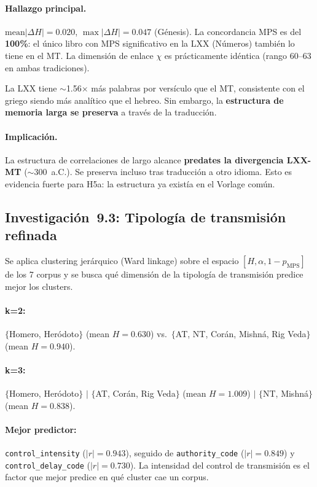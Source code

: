 \documentclass[12pt,a4paper]{article}
\begin{document}
\paragraph{Hallazgo principal.}
$\text{mean}|\Delta H| = 0.020$, $\max|\Delta H| = 0.047$ (G\'enesis).
La concordancia MPS es del \textbf{100\%}: el \'unico libro con MPS significativo
en la LXX (N\'umeros) tambi\'en lo tiene en el MT. La dimensi\'on de enlace $\chi$
es pr\'acticamente id\'entica (rango 60--63 en ambas tradiciones).

La LXX tiene $\sim$1.56$\times$ m\'as palabras por vers\'iculo que el MT, consistente
con el griego siendo m\'as anal\'itico que el hebreo. Sin embargo, la
\textbf{estructura de memoria larga se preserva} a trav\'es de la traducci\'on.

\paragraph{Implicaci\'on.}
La estructura de correlaciones de largo alcance \textbf{predates la divergencia
LXX-MT} ($\sim$300~a.C.). Se preserva incluso tras traducci\'on a otro idioma.
Esto es evidencia fuerte para H5a: la estructura ya exist\'ia en el Vorlage com\'un.


\subsection{Investigaci\'on~9.3: Tipolog\'ia de transmisi\'on refinada}

Se aplica clustering jer\'arquico (Ward linkage) sobre el espacio
$[H, \alpha, 1 - p_{\text{MPS}}]$ de los 7 corpus y se busca qu\'e
dimensi\'on de la tipolog\'ia de transmisi\'on predice mejor los clusters.

\paragraph{k=2:} $\{$Homero, Her\'odoto$\}$ (mean $H = 0.630$) vs.\
$\{$AT, NT, Cor\'an, Mishn\'a, Rig Veda$\}$ (mean $H = 0.940$).

\paragraph{k=3:} $\{$Homero, Her\'odoto$\}$ $|$ $\{$AT, Cor\'an, Rig Veda$\}$
(mean $H = 1.009$) $|$ $\{$NT, Mishn\'a$\}$ (mean $H = 0.838$).

\paragraph{Mejor predictor:} \texttt{control\_intensity} ($|r| = 0.943$),
seguido de \texttt{authority\_code} ($|r| = 0.849$) y \texttt{control\_delay\_code}
($|r| = 0.730$). La intensidad del control de transmisi\'on es el factor que
mejor predice en qu\'e cluster cae un corpus.
\end{document}

